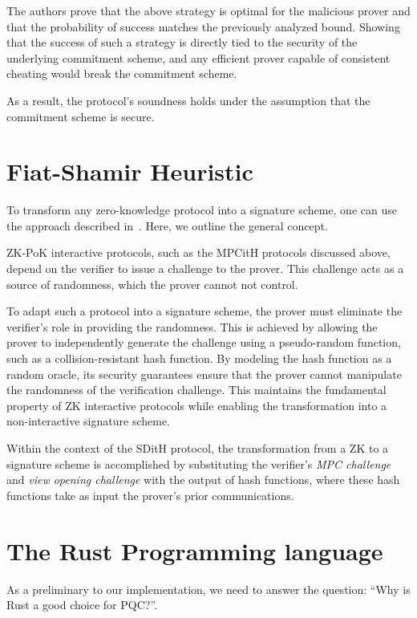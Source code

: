 \documentclass[11pt]{report}
\theoremstyle{definition}
\theoremstyle{plain}
\begin{document}
The authors prove that the above strategy is optimal for the malicious prover and that the probability of success matches the previously analyzed bound. Showing that the success of such a strategy is directly tied to the security of the underlying commitment scheme, and any efficient prover capable of consistent cheating would break the commitment scheme.

As a result, the protocol's soundness holds under the assumption that the commitment scheme is secure.


\section{Fiat-Shamir Heuristic}\label{sec:fiatshamir}
To transform any zero-knowledge protocol into a signature scheme, one can use the approach described in~\cite{fiat1986prove}. Here, we outline the general concept.

ZK-PoK interactive protocols, such as the MPCitH protocols discussed above, depend on the verifier to issue a challenge to the prover. This challenge acts as a source of randomness, which the prover cannot not control.

To adapt such a protocol into a signature scheme, the prover must eliminate the verifier's role in providing the randomness. This is achieved by allowing the prover to independently generate the challenge using a pseudo-random function, such as a collision-resistant hash function. By modeling the hash function as a random oracle, its security guarantees ensure that the prover cannot manipulate the randomness of the verification challenge. This maintains the fundamental property of ZK interactive protocols while enabling the transformation into a non-interactive signature scheme.

Within the context of the SDitH protocol, the transformation from a ZK to a signature scheme is accomplished by substituting the verifier's \textit{MPC challenge} and \textit{view opening challenge} with the output of hash functions, where these hash functions take as input the prover's prior communications.

\section{The Rust Programming language}\label{sec:rust}
As a preliminary to our implementation, we need to answer the question: ``Why is Rust a good choice for PQC?''.
\end{document}
